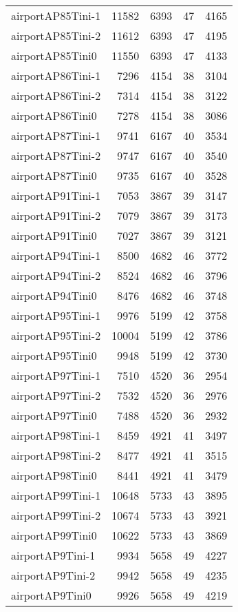 \begin{longtable}{lrrrr}
airportAP85Tini-1 & 11582 & 6393 & 47 & 4165 \\
airportAP85Tini-2 & 11612 & 6393 & 47 & 4195 \\
airportAP85Tini0 & 11550 & 6393 & 47 & 4133 \\
airportAP86Tini-1 & 7296 & 4154 & 38 & 3104 \\
airportAP86Tini-2 & 7314 & 4154 & 38 & 3122 \\
airportAP86Tini0 & 7278 & 4154 & 38 & 3086 \\
airportAP87Tini-1 & 9741 & 6167 & 40 & 3534 \\
airportAP87Tini-2 & 9747 & 6167 & 40 & 3540 \\
airportAP87Tini0 & 9735 & 6167 & 40 & 3528 \\
airportAP91Tini-1 & 7053 & 3867 & 39 & 3147 \\
airportAP91Tini-2 & 7079 & 3867 & 39 & 3173 \\
airportAP91Tini0 & 7027 & 3867 & 39 & 3121 \\
airportAP94Tini-1 & 8500 & 4682 & 46 & 3772 \\
airportAP94Tini-2 & 8524 & 4682 & 46 & 3796 \\
airportAP94Tini0 & 8476 & 4682 & 46 & 3748 \\
airportAP95Tini-1 & 9976 & 5199 & 42 & 3758 \\
airportAP95Tini-2 & 10004 & 5199 & 42 & 3786 \\
airportAP95Tini0 & 9948 & 5199 & 42 & 3730 \\
airportAP97Tini-1 & 7510 & 4520 & 36 & 2954 \\
airportAP97Tini-2 & 7532 & 4520 & 36 & 2976 \\
airportAP97Tini0 & 7488 & 4520 & 36 & 2932 \\
airportAP98Tini-1 & 8459 & 4921 & 41 & 3497 \\
airportAP98Tini-2 & 8477 & 4921 & 41 & 3515 \\
airportAP98Tini0 & 8441 & 4921 & 41 & 3479 \\
airportAP99Tini-1 & 10648 & 5733 & 43 & 3895 \\
airportAP99Tini-2 & 10674 & 5733 & 43 & 3921 \\
airportAP99Tini0 & 10622 & 5733 & 43 & 3869 \\
airportAP9Tini-1 & 9934 & 5658 & 49 & 4227 \\
airportAP9Tini-2 & 9942 & 5658 & 49 & 4235 \\
airportAP9Tini0 & 9926 & 5658 & 49 & 4219 \\

\end{longtable}
